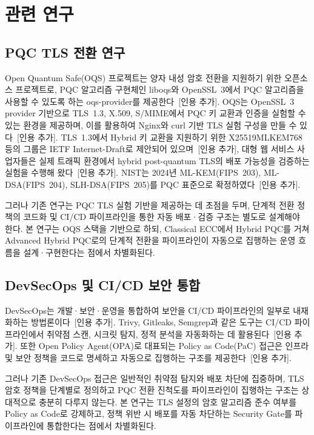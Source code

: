 \section{관련 연구}

\subsection{PQC TLS 전환 연구}

Open Quantum Safe(OQS) 프로젝트는 양자 내성 암호 전환을 지원하기 위한 오픈소스 프로젝트로, PQC 알고리즘 구현체인 liboqs와 OpenSSL~3에서 PQC 알고리즘을 사용할 수 있도록 하는 oqs-provider를 제공한다~[인용 추가].
OQS는 OpenSSL~3 provider 기반으로 TLS~1.3, X.509, S/MIME에서 PQC 키 교환과 인증을 실험할 수 있는 환경을 제공하며, 이를 활용하여 Nginx와 curl 기반 TLS 실험 구성을 만들 수 있다~[인용 추가].
TLS~1.3에서 Hybrid 키 교환을 지원하기 위한 X25519MLKEM768 등의 그룹은 IETF Internet-Draft로 제안되어 있으며~[인용 추가], 대형 웹 서비스 사업자들은 실제 트래픽 환경에서 hybrid post-quantum TLS의 배포 가능성을 검증하는 실험을 수행해 왔다~[인용 추가].
NIST는 2024년 ML-KEM(FIPS~203), ML-DSA(FIPS~204), SLH-DSA(FIPS~205)를 PQC 표준으로 확정하였다~[인용 추가].

그러나 기존 연구는 PQC TLS 실험 기반을 제공하는 데 초점을 두며, 단계적 전환 정책의 코드화 및 CI/CD 파이프라인을 통한 자동 배포·검증 구조는 별도로 설계해야 한다.
본 연구는 OQS 스택을 기반으로 하되, Classical ECC에서 Hybrid PQC를 거쳐 Advanced Hybrid PQC로의 단계적 전환을 파이프라인이 자동으로 집행하는 운영 흐름을 설계·구현한다는 점에서 차별화된다.

\subsection{DevSecOps 및 CI/CD 보안 통합}

DevSecOps는 개발·보안·운영을 통합하여 보안을 CI/CD 파이프라인의 일부로 내재화하는 방법론이다~[인용 추가].
Trivy, Gitleaks, Semgrep과 같은 도구는 CI/CD 파이프라인에서 취약점 스캔, 시크릿 탐지, 정적 분석을 자동화하는 데 활용된다~[인용 추가].
또한 Open Policy Agent(OPA)로 대표되는 Policy as Code(PaC) 접근은 인프라 및 보안 정책을 코드로 명세하고 자동으로 집행하는 구조를 제공한다~[인용 추가].

그러나 기존 DevSecOps 접근은 일반적인 취약점 탐지와 배포 차단에 집중하며, TLS 암호 정책을 단계별로 정의하고 PQC 전환 진척도를 파이프라인이 집행하는 구조는 상대적으로 충분히 다루지 않는다.
본 연구는 TLS 설정의 암호 알고리즘 준수 여부를 Policy as Code로 강제하고, 정책 위반 시 배포를 자동 차단하는 Security Gate를 파이프라인에 통합한다는 점에서 차별화된다.

